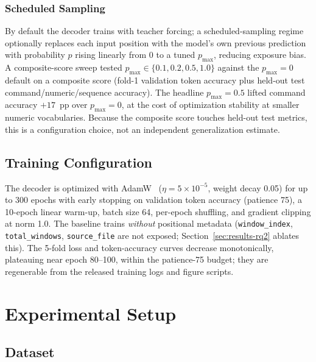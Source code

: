 \documentclass[sensors,article,submit,moreauthors,pdftex]{Definitions/mdpi}
\begin{document}
\subsubsection{Scheduled Sampling}
\label{sec:scheduled-sampling}

By default the decoder trains with teacher forcing; a scheduled-sampling regime~\cite{scheduled_sampling} optionally replaces each input position with the model's own previous prediction with probability $p$ rising linearly from $0$ to a tuned $p_{\text{max}}$, reducing exposure bias. A composite-score sweep tested $p_{\text{max}} \in \{0.1, 0.2, 0.5, 1.0\}$ against the $p_{\text{max}}\!=\!0$ default on a composite score (fold-1 validation token accuracy plus held-out test command/numeric/sequence accuracy). The headline $p_{\text{max}}\!=\!0.5$ lifted command accuracy $+17$~pp over $p_{\text{max}}\!=\!0$, at the cost of optimization stability at smaller numeric vocabularies. Because the composite score touches held-out test metrics, this is a configuration choice, not an independent generalization estimate.

\subsection{Training Configuration}
\label{sec:training}

The decoder is optimized with AdamW~\cite{loshchilov2019adamw} ($\eta = 5 \times 10^{-5}$, weight decay 0.05) for up to 300 epochs with early stopping on validation token accuracy (patience 75), a 10-epoch linear warm-up, batch size 64, per-epoch shuffling, and gradient clipping at norm 1.0. The baseline trains \emph{without} positional metadata (\texttt{window\_index}, \texttt{total\_windows}, \texttt{source\_file} are not exposed; Section~\ref{sec:results-rq2} ablates this). The 5-fold loss and token-accuracy curves decrease monotonically, plateauing near epoch 80--100, within the patience-75 budget; they are regenerable from the released training logs and figure scripts.




\section{Experimental Setup}
\label{sec:setup}

\subsection{Dataset}
\label{sec:dataset}
\end{document}
